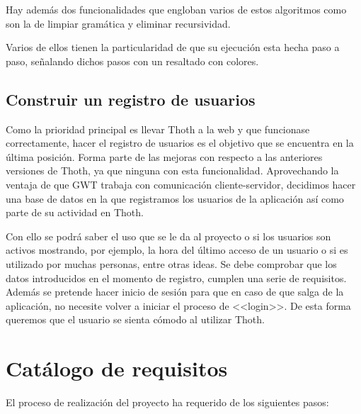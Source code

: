 Hay además dos funcionalidades que engloban varios de estos algoritmos como son la de limpiar gramática y eliminar recursividad.

Varios de ellos tienen la particularidad de que su ejecución esta hecha paso a paso, señalando dichos pasos con un resaltado con colores.

\subsection{Construir un registro de usuarios}

Como la prioridad principal es llevar Thoth a la web y que funcionase correctamente, hacer el registro de usuarios es el objetivo que se encuentra en la última posición. Forma parte de las mejoras con respecto a las anteriores versiones de Thoth, ya que ninguna con esta funcionalidad. Aprovechando la ventaja de que GWT trabaja con comunicación cliente-servidor, decidimos hacer una base de datos en la que registramos los usuarios de la aplicación así como parte de su actividad en Thoth.

Con ello se podrá saber el uso que se le da al proyecto o si los usuarios son activos mostrando, por ejemplo, la hora del último acceso de un usuario o si es utilizado por muchas personas, entre otras ideas. Se debe comprobar que los datos introducidos en el momento de registro, cumplen una serie de requisitos. Además se pretende hacer inicio de sesión para que en caso de que salga de la aplicación, no necesite volver a iniciar el proceso de <<login>>. De esta forma queremos que el usuario se sienta cómodo al utilizar Thoth.
\section{Catálogo de requisitos}

El proceso de realización del proyecto ha requerido de los siguientes pasos:

